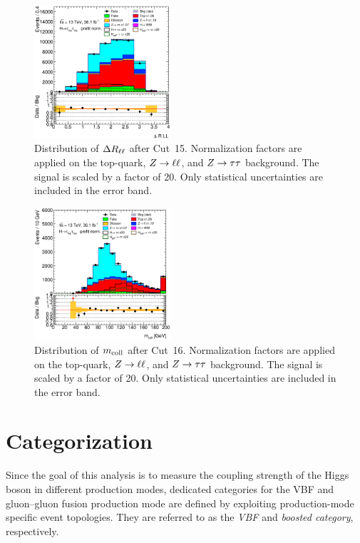 \begin{figure}[htb]
    \centering
    \includegraphics[width=0.45\textwidth]{./plots/event_selection/ll-CutDEtaLL-DeltaRLL-lin.eps}
    \caption{Distribution of $\Delta R_{\ell\ell}$ after Cut~15.
             Normalization factors are applied on the top-quark, $Z \to \ell \ell$, and $Z \to \tau \tau$ background.
             The signal is scaled by a factor of 20.
             Only statistical uncertainties are included in the error band.}\label{fig:event_selection:cutflow:drll}
\end{figure}

\begin{figure}[htb]
    \centering
    \includegraphics[width=0.45\textwidth]{./plots/event_selection/ll-CutDRLL-mcoll-lin.eps}
    \caption{Distribution of $m_\text{coll}$ after Cut~16.
             Normalization factors are applied on the top-quark, $Z \to \ell \ell$, and $Z \to \tau \tau$ background.
             The signal is scaled by a factor of 20.
             Only statistical uncertainties are included in the error band.}\label{fig:event_selection:cutflow:mcoll}
\end{figure}


\section{Categorization}\label{sec:event_selection:categorization}

Since the goal of this analysis is to measure the coupling strength of the Higgs boson
in different production modes, dedicated categories for the VBF and gluon--gluon fusion production mode
are defined by exploiting production-mode specific event topologies.
They are referred to as the \emph{VBF} and \emph{boosted category}, respectively.

